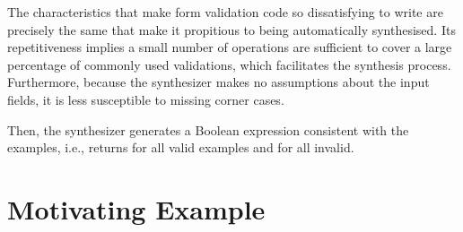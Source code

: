 The characteristics that make form validation code so dissatisfying to write are precisely the same that make it propitious to being automatically synthesised.
Its repetitiveness implies a small number of operations are sufficient to cover a large percentage of commonly used validations, which facilitates the synthesis process.
Furthermore, because the synthesizer makes no assumptions about the input fields, it is less susceptible to missing corner cases.

Then, the synthesizer generates a Boolean expression consistent with the examples, i.e., returns \true{} for all valid examples and \false{} for all invalid.


\section{Motivating Example}\label{ex:1}

